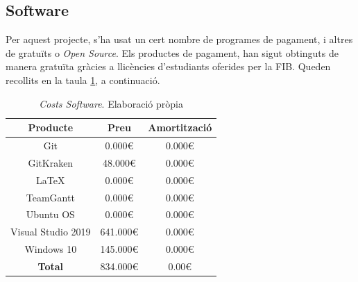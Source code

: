 \documentclass[a4paper]{article} %
\begin{document}
	\subsection{Software}
	Per aquest projecte, s'ha usat un cert nombre de programes de pagament, i altres de gratuïts o \textit{Open Source}. Els productes de pagament, han sigut obtinguts de manera gratuïta gràcies a llicències d'estudiants oferides per la FIB.
	Queden recollits en la taula \ref{table:softwareCosts}, a continuació.
	\begin{table}[h!]
		\centering
		\begin{tabular}{|| c || c | c||}
			\hline
			\textbf{Producte} & \textbf{Preu} &\textbf{Amortització} \\
			\hline \hline
			Git		 	& 0.000\euro 	& 0.000\euro \\
			GitKraken\footnote	& 48.000\euro   & 0.000\euro \\
			\LaTeX 		& 0.000\euro 	& 0.000\euro \\
			TeamGantt 	& 0.000\euro	& 0.000\euro \\
			Ubuntu OS 	& 0.000\euro  	& 0.000\euro \\
			Visual Studio 2019\footnote& 641.000\euro & 0.000\euro \\
			Windows 10\footnote[3] 	& 145.000\euro 	& 0.000\euro \\
			\hline \hline
			\textbf{Total} & 834.000\euro & 0.00\euro \\
			\hline
		\end{tabular}
		\caption[\textit{Costs Software}]{\textit{\small Costs Software}. Elaboració pròpia}
		\label{table:softwareCosts}
	\end{table}
	
\end{document}

